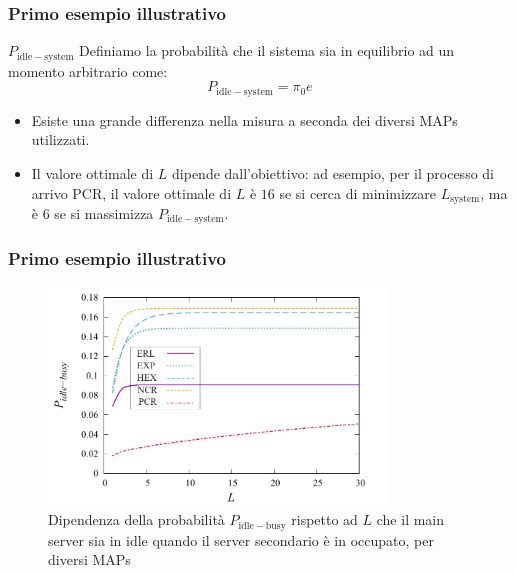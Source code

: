 \documentclass{beamer}
\begin{document}
\begin{frame}
    \frametitle{Primo esempio illustrativo}
        \begin{block}{$P_{\mathrm{idle-system}}$}
            Definiamo la probabilità che il sistema sia in equilibrio ad un momento arbitrario come:
            $$  P_{\mathrm{idle-system}} = \pi_0 e $$
        \end{block}
        \begin{itemize}
            \item Esiste una grande differenza nella misura a seconda dei diversi MAPs utilizzati.
            \item Il valore ottimale di $L$ dipende dall'obiettivo: ad esempio, per il processo di arrivo PCR, il valore ottimale di $L$ è $16$ se si cerca di minimizzare $L_{\mathrm{system}}$, ma è 6 se si massimizza $P_{\mathrm{idle-system}}$.
        \end{itemize}
\end{frame}


\begin{frame}
    \frametitle{Primo esempio illustrativo}
    \begin{figure}[h]
        \centering
        \includegraphics[width=0.8\textwidth]{VrxLKYI.png}
        \caption{Dipendenza della probabilità $P_{\mathrm{idle-busy}}$ rispetto ad $L$ che il main server sia in idle quando il server secondario è in occupato, per diversi MAPs}
        \label{fig:4}
    \end{figure}
\end{frame}
\end{document}
